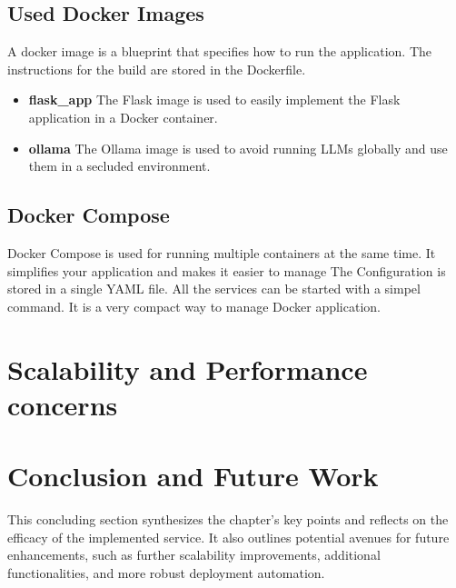 \subsection{Used Docker Images}
A docker image is a blueprint that specifies how to run the application. The instructions for the build are stored in the Dockerfile.
\cite{dockerize_flask} 

\begin{itemize}
    \item \textbf{flask\_app} The Flask image is used to easily implement the Flask application in a Docker container.
    \item \textbf{ollama} The Ollama image is used to avoid running LLMs globally and use them in a secluded environment.
\end{itemize}

\subsection{Docker Compose}
Docker Compose is used for running multiple containers at the same time. It simplifies your application and makes it easier to manage 
The Configuration is stored in a single YAML file. All the services can be started with a simpel command. It is a very compact way to manage Docker application.
\cite{docker_compose} 


\section{Scalability and Performance concerns}

\section{Conclusion and Future Work}
This concluding section synthesizes the chapter’s key points and reflects on the efficacy of the implemented service. It also outlines potential avenues for future enhancements, such as further scalability improvements, additional functionalities, and more robust deployment automation.





